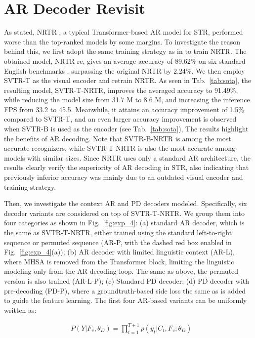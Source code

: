 \documentclass[10pt,journal,compsoc]{IEEEtran}
\begin{document}
\section{AR Decoder Revisit}
As stated, NRTR \cite{Sheng2019nrtr}, a typical Transformer-based AR model for STR, performed worse than the top-ranked models by some margins. To investigate the reason behind this, we first adopt the same training strategy as in \cite{fang2021abinet} to train NRTR. The obtained model, NRTR-re, gives an average accuracy of 89.62\% on six standard English benchmarks \cite{whatwrong}, surpassing the original NRTR \cite{Sheng2019nrtr} by 2.24\%. We then employ SVTR-T as the visual encoder and retrain NRTR. As seen in Tab.~\ref{tab:sota}, the resulting model, SVTR-T-NRTR, improves the averaged accuracy to 91.49\%, while reducing the model size from 31.7 M to 8.6 M, and increasing the inference FPS from 33.2 to 45.5. Meanwhile, it attains an accuracy improvement of 1.5\% compared to SVTR-T, and an even larger accuracy improvement is observed when SVTR-B is used as the encoder (see Tab.~\ref{tab:sota}), The results highlight the benefits of AR decoding. Note that SVTR-B-NRTR is among the most accurate recognizers, while SVTR-T-NRTR is also the most accurate among models with similar sizes. Since NRTR uses only a standard AR architecture, the results clearly verify the superiority of AR decoding in STR, also indicating that previously inferior accuracy was mainly due to an outdated visual encoder and training strategy.


Then, we investigate the context AR and PD decoders modeled. Specifically, six decoder variants are considered on top of SVTR-T-NRTR. We group them into four categories as shown in Fig.~\ref{fig:exp_4}: (a) standard AR decoder, which is the same as SVTR-T-NRTR, either trained using the standard left-to-right sequence or permuted sequence \cite{BautistaA22PARSeq} (AR-P, with the dashed red box enabled in Fig.~\ref{fig:exp_4}(a)); (b) AR decoder with limited linguistic context (AR-L), where MHSA is removed from the Transformer block, limiting the linguistic modeling only from the AR decoding loop. The same as above, the permuted version is also trained (AR-L-P); (c) Standard PD decoder; (d) PD decoder with pre-decoding (PD-P), where a groundtruth-based side loss the same as \cite{yu2020srn} is added to guide the feature learning. The first four AR-based variants can be uniformly written as: 


\begin{align}
    &P(Y| F_v, \theta_D) =  \prod\limits_{t=1}^{T+1} p(y_t|C_t, F_v;  \theta_D)
\end{align}
\end{document}
